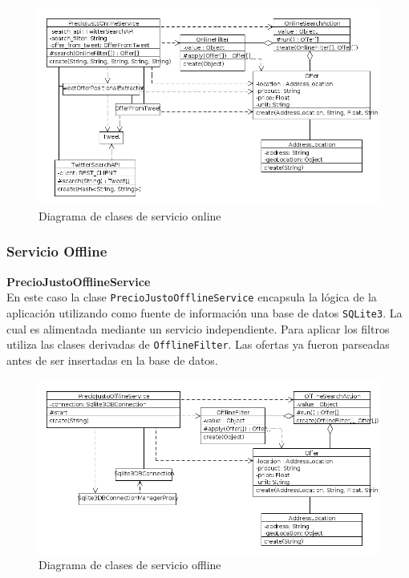 \begin{figure}[h]
\centerline{\includegraphics[width=\textwidth]{./imgs/class_diagram_online_service.png}}
\caption{Diagrama de clases de servicio online}
\label{fig:class_online_service}
\end{figure}

\subsubsection{Servicio Offline}

\textbf{PrecioJustoOfflineService}\\

En este caso la clase \texttt{PrecioJustoOfflineService} encapsula la lógica de la aplicación utilizando como fuente de información una base de datos \texttt{SQLite3}. La cual es alimentada mediante un servicio independiente.
Para aplicar los filtros utiliza las clases derivadas de \texttt{OfflineFilter}. Las ofertas
ya fueron parseadas antes de ser insertadas en la base de datos.

\begin{figure}[h]
\centerline{\includegraphics[width=\textwidth]{./imgs/class_diagram_offline_service.png}}
\caption{Diagrama de clases de servicio offline}
\label{fig:class_offline_service}
\end{figure}

